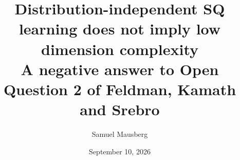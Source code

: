 \documentclass[11pt]{article}
\title{Distribution-independent SQ learning does not imply low dimension complexity\\[7pt]
\large A negative answer to Open Question 2 of Feldman, Kamath and Srebro}
\author{Samuel Mausberg}
\date{September 10, 2026}
\begin{document}
\maketitle
\begin{abstract}

\end{abstract}










\label{main-end}
\clearpage


\clearpage
\appendix













\end{document}
